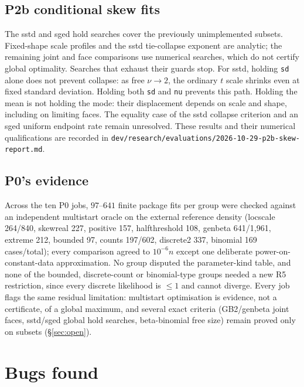 \documentclass[11pt]{article}
\newcommand{\code}[1]{\texttt{#1}}
\theoremstyle{plain}
\theoremstyle{definition}
\theoremstyle{remark}
\begin{document}
\subsection*{P2b conditional skew fits}

The sstd and sged hold searches cover the previously unimplemented subsets.
Fixed-shape scale profiles and the sstd tie-collapse exponent are analytic;
the remaining joint and face comparisons use numerical searches, which do
not certify global optimality. Searches that exhaust their guards stop.
For sstd, holding \code{sd} alone does not prevent collapse: as free
$\nu\to2$, the ordinary $t$ scale shrinks even at fixed standard deviation.
Holding both \code{sd} and \code{nu} prevents this path. Holding the mean
is not holding the mode: their displacement depends on scale and shape,
including on limiting faces. The equality case of the sstd collapse criterion
and an sged uniform endpoint rate remain unresolved. These results and their
numerical qualifications are recorded in \code{dev/research/evaluations/2026-10-29-p2b-skew-report.md}.

\subsection*{P0's evidence}

Across the ten P0 jobs, $97$--$641$ finite package fits per group were
checked against an independent multistart oracle on the external reference
density (locscale 264/840, skewreal 227, positive 157, halfthreshold 108,
genbeta 641/1{,}961, extreme 212, bounded 97, counts 197/602, discrete2 337,
binomial 169 cases/total); every comparison agreed to $10^{-6}n$ except one
deliberate power-on-constant-data approximation. No group disputed the
parameter-kind table, and none of the bounded, discrete-count or
binomial-type groups needed a new R5 restriction, since every discrete
likelihood is $\le1$ and cannot diverge. Every job flags the same residual
limitation: multistart optimisation is evidence, not a certificate, of a
global maximum, and several exact criteria (GB2/genbeta joint faces,
sstd/sged global hold searches, beta-binomial free size) remain proved only
on subsets (\S\ref{sec:open}).

\section{Bugs found}\label{sec:bugs}
\end{document}
